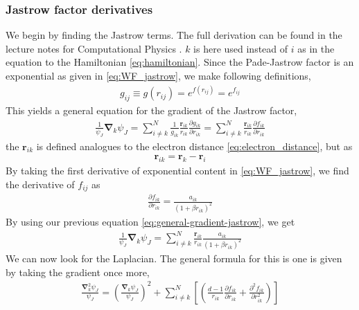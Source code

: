 \documentclass[11pt]{article}
\begin{document}
\subsubsection{Jastrow factor derivatives}
We begin by finding the Jastrow terms. The full derivation can be found in the lecture notes for Computational Physics \cite{komp2015}. $k$ is here used instead of $i$ as in the equation to the Hamiltonian \eqref{eq:hamiltonian}. Since the Pade-Jastrow factor is an exponential as given in \eqref{eq:WF_jastrow}, we make following definitions,
\begin{align}
	g_{ij} \equiv g(r_{ij}) = e^{f(r_{ij})} = e^{f_{ij}}
	\label{eq:pade-jastrow-eq}
\end{align}
This yields a general equation for the gradient of the Jastrow factor,
\begin{align}
	\frac{1}{\psi_J}\bm{\nabla}_k\psi_J = \sum^{N}_{i\neq k} \frac{1}{g_{ik}} \frac{\mathbf{r}_{ik}}{r_{ik}}\frac{\partial g_{ik}}{\partial r_{ik}} = \sum^N_{i\neq k} \frac{\mathbf{r}_{ik}}{r_{ik}}\frac{\partial f_{ik}}{\partial r_{ik}}
	\label{eq:general-gradient-jastrow}
\end{align}
the $\mathbf{r}_{ik}$ is defined analogues to the electron distance \eqref{eq:electron_distance}, but as
\begin{align}
	\mathbf{r}_{ik} = \mathbf{r}_k - \mathbf{r}_i
	\label{eq:electron-distance-vector}
\end{align}
By taking the first derivative of exponential content in \eqref{eq:WF_jastrow}, we find the derivative of $f_{ij}$ as
\begin{align}
	\frac{\partial f_{ik}}{\partial r_{ik}} = \frac{a_{ik}}{(1+\beta r_{ik})^2}
	\label{eq:jastrow-f-derivative}
\end{align}
By using our previous equation \eqref{eq:general-gradient-jastrow}, we get
\begin{align}
	\frac{1}{\psi_J}\bm{\nabla}_k\psi_J = \sum_{i\neq k}^N \frac{\mathbf{r}_{ik}}{r_{ik}}\frac{a_{ik}}{(1+\beta r_{ik})^2}
	\label{eq:n-body-jastrow-grad}
\end{align}
We can now look for the Laplacian. The general formula for this is one is given by taking the gradient once more,
\begin{align}
	\frac{\bm{\nabla}_k^2\psi_J}{\psi_J} = \left( \frac{\bm{\nabla}_k\psi_J}{\psi_J} \right)^2 + \sum^N_{i\neq k} \left[\left( \frac{d-1}{r_{ik}} \frac{\partial f_{ik}}{\partial r_{ik}} + \frac{\partial^2f_{ik}}{\partial r_{ik}^2} \right)  \right]
	\label{eq:general-laplacian-jastrow}
\end{align}
\end{document}
